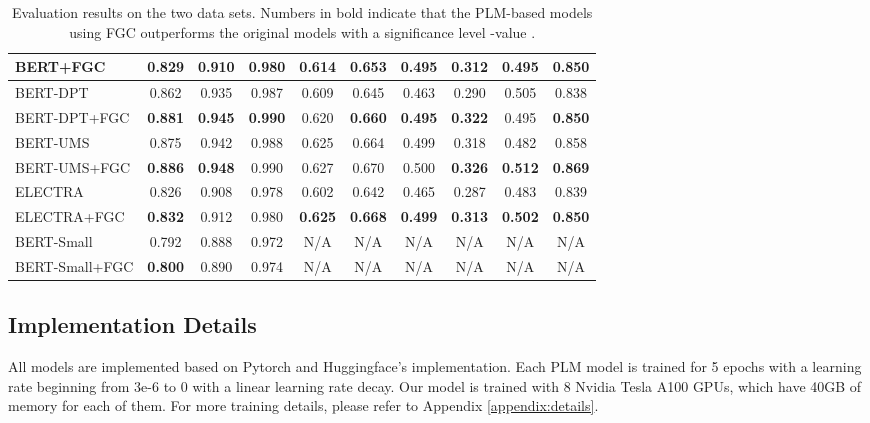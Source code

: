\documentclass[letterpaper]{article} \usepackage{aaai22}  \usepackage{times}  \usepackage{helvet}  \usepackage{courier}  \usepackage[hyphens]{url}  \usepackage{graphicx} \urlstyle{rm} \def\UrlFont{\rm}  \usepackage{natbib}  \usepackage{caption} \DeclareCaptionStyle{ruled}{labelfont=normalfont,labelsep=colon,strut=off} \frenchspacing  \setlength{\pdfpagewidth}{8.5in}  \setlength{\pdfpageheight}{11in}  \usepackage{algorithm}
\begin{document}
\begin{table*}[htbp]
{\begin{tabular}{lccccccccc}
\multicolumn{1}{l|}{BERT+FGC}               & \textbf{0.829} & 0.910 & \multicolumn{1}{c|}{0.980} & \textbf{0.614} & \textbf{0.653} & \textbf{0.495} & \textbf{0.312} & 0.495 & \textbf{0.850} \\ \hline
\multicolumn{1}{l|}{BERT-DPT~\cite{whang2020domain}}               & 0.862 & 0.935 & \multicolumn{1}{c|}{0.987} & 0.609 & 0.645 & 0.463 & 0.290 & 0.505 & 0.838 \\
\multicolumn{1}{l|}{BERT-DPT+FGC}           & \textbf{0.881} & \textbf{0.945} & \multicolumn{1}{c|}{\textbf{0.990}} & 0.620 & \textbf{0.660} & \textbf{0.495} & \textbf{0.322} & 0.495 & \textbf{0.850} \\ \hline
\multicolumn{1}{l|}{BERT-UMS~\cite{whang2021ums}}               & 0.875 & 0.942 & \multicolumn{1}{c|}{0.988} & 0.625 & 0.664 & 0.499 & 0.318 & 0.482 & 0.858 \\
\multicolumn{1}{l|}{BERT-UMS+FGC}           & \textbf{0.886} & \textbf{0.948} & \multicolumn{1}{c|}{0.990} & 0.627 & 0.670 & 0.500 & \textbf{0.326} & \textbf{0.512} & \textbf{0.869} \\ \hline
\multicolumn{1}{l|}{ELECTRA}                & 0.826 & 0.908 & \multicolumn{1}{c|}{0.978} & 0.602 & 0.642 & 0.465 & 0.287 & 0.483 & 0.839 \\
\multicolumn{1}{l|}{ELECTRA+FGC}            & \textbf{0.832} & 0.912 & \multicolumn{1}{c|}{0.980} & \textbf{0.625} & \textbf{0.668} & \textbf{0.499} & \textbf{0.313} & \textbf{0.502} & \textbf{0.850} \\ \hline
\multicolumn{1}{l|}{BERT-Small}             & 0.792 & 0.888 & \multicolumn{1}{c|}{0.972} & N/A   & N/A   & N/A   & N/A   & N/A   & N/A   \\
\multicolumn{1}{l|}{BERT-Small+FGC}         & \textbf{0.800} & 0.890 & \multicolumn{1}{c|}{0.974} & N/A   & N/A   & N/A   & N/A   & N/A   & N/A   \\
\bottomrule
\end{tabular}

}
\caption{Evaluation results on the two data sets. Numbers in bold indicate that the PLM-based models using FGC outperforms the original models with a significance level -value .} \label{table:result}
\end{table*} 
\subsection{Implementation Details}

All models are implemented based on Pytorch and Huggingface's implementation. Each PLM model is trained for 5 epochs with a learning rate beginning from 3e-6 to 0 with a linear learning rate decay. Our model is trained with 8 Nvidia Tesla A100 GPUs, which have 40GB of memory for each of them. For more training details, please refer to Appendix \ref{appendix:details}.
\end{document}
